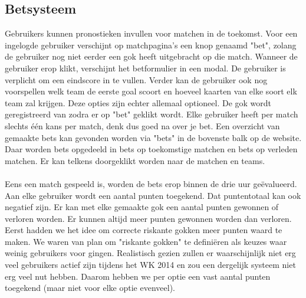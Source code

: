 \documentclass[11pt, a4paper]{article}
\begin{document}
\subsection{Betsysteem}
Gebruikers kunnen pronostieken invullen voor matchen in de toekomst. Voor een ingelogde gebruiker verschijnt op matchpagina's een knop genaamd "bet", zolang de gebruiker nog niet eerder een gok heeft uitgebracht op die match. Wanneer de gebruiker erop klikt, verschijnt het betformulier in een modal. De gebruiker is verplicht om een eindscore in te vullen. Verder kan de gebruiker ook nog voorspellen welk team de eerste goal scoort en hoeveel kaarten van elke soort elk team zal krijgen. Deze opties zijn echter allemaal optioneel. De gok wordt geregistreerd van zodra er op "bet" geklikt wordt. Elke gebruiker heeft per match slechts \'e\'en kans per match, denk dus goed na over je bet. Een overzicht van gemaakte bets kan gevonden worden via "bets" in de bovenste balk op de website. Daar worden bets opgedeeld in bets op toekomstige matchen en bets op verleden matchen. Er kan telkens doorgeklikt worden naar de matchen en teams. \\ \\
Eens een match gespeeld is, worden de bets erop binnen de drie uur ge\"evalueerd. Aan elke gebruiker wordt een aantal punten toegekend. Dat puntentotaal kan ook negatief zijn. Er kan met elke gemaakte gok een aantal punten gewonnen of verloren worden. Er kunnen altijd meer punten gewonnen worden dan verloren. Eerst hadden we het idee om correcte riskante gokken meer punten waard te maken. We waren van plan om "riskante gokken" te defini\"eren als keuzes waar weinig gebruikers voor gingen. Realistisch gezien zullen er waarschijnlijk niet erg veel gebruikers actief zijn tijdens het WK 2014 en zou een dergelijk systeem niet erg veel nut hebben. Daarom hebben we per optie een vast aantal punten toegekend (maar niet voor elke optie evenveel). \\ \\
\end{document}
